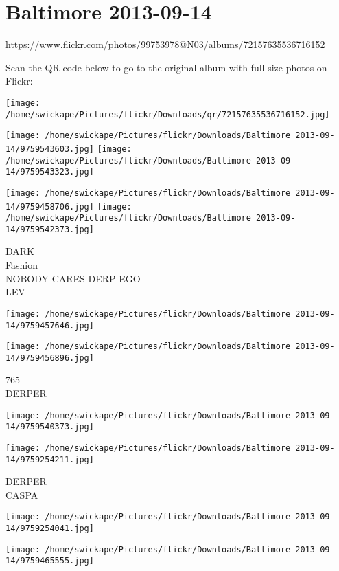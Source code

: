 \documentclass[10pt,letterpaper]{article}
\begin{document}
\section*{Baltimore 2013-09-14}

\url{https://www.flickr.com/photos/99753978@N03/albums/72157635536716152}

Scan the QR code below to go to the original album with full-size photos on Flickr:

\texttt{[image: /home/swickape/Pictures/flickr/Downloads/qr/72157635536716152.jpg]}
\pagebreak

\texttt{[image: /home/swickape/Pictures/flickr/Downloads/Baltimore 2013-09-14/9759543603.jpg]}
\texttt{[image: /home/swickape/Pictures/flickr/Downloads/Baltimore 2013-09-14/9759543323.jpg]}

\texttt{[image: /home/swickape/Pictures/flickr/Downloads/Baltimore 2013-09-14/9759458706.jpg]}
\texttt{[image: /home/swickape/Pictures/flickr/Downloads/Baltimore 2013-09-14/9759542373.jpg]}

DARK\\
Fashion\\
NOBODY CARES DERP EGO\\
LEV
\pagebreak

\texttt{[image: /home/swickape/Pictures/flickr/Downloads/Baltimore 2013-09-14/9759457646.jpg]}

\vspace{0.25in}
\texttt{[image: /home/swickape/Pictures/flickr/Downloads/Baltimore 2013-09-14/9759456896.jpg]}

765\\
DERPER
\pagebreak

\texttt{[image: /home/swickape/Pictures/flickr/Downloads/Baltimore 2013-09-14/9759540373.jpg]}

\vspace{0.25in}
\texttt{[image: /home/swickape/Pictures/flickr/Downloads/Baltimore 2013-09-14/9759254211.jpg]}

DERPER\\
CASPA
\pagebreak

\texttt{[image: /home/swickape/Pictures/flickr/Downloads/Baltimore 2013-09-14/9759254041.jpg]}

\vspace{0.25in}
\texttt{[image: /home/swickape/Pictures/flickr/Downloads/Baltimore 2013-09-14/9759465555.jpg]}
\end{document}

